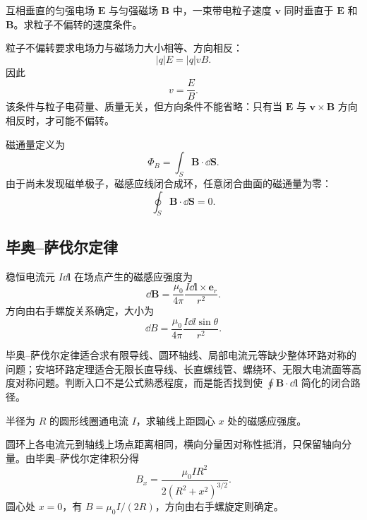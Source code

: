 \begin{example}[title={速度选择器}]\label{eg:velocity-selector}
互相垂直的匀强电场 $\bm E$ 与匀强磁场 $\bm B$ 中，一束带电粒子速度 $\bm v$ 同时垂直于 $\bm E$ 和 $\bm B$。求粒子不偏转的速度条件。
\begin{solution}
粒子不偏转要求电场力与磁场力大小相等、方向相反：
\[
  |q|E=|q|vB.
\]
因此
\[
  v=\frac{E}{B}.
\]
该条件与粒子电荷量、质量无关，但方向条件不能省略：只有当 $\bm E$ 与 $\bm v\times\bm B$ 方向相反时，才可能不偏转。
\end{solution}
\end{example}

\begin{definition}[磁通量与磁场高斯定理]\label{def:magnetic-flux}
磁通量定义为
\[
  \Phi_B=\int_S\bm B\cdot\dd\bm S.
\]
由于尚未发现磁单极子，磁感应线闭合成环，任意闭合曲面的磁通量为零：
\[
  \oint_S\bm B\cdot\dd\bm S=0.
\]
\end{definition}

\subsection{毕奥--萨伐尔定律}

\begin{theorem}[毕奥--萨伐尔定律]\label{thm:biot-savart}
稳恒电流元 $I\dd\bm l$ 在场点产生的磁感应强度为
\[
  \dd\bm B=\frac{\mu_0}{4\pi}\frac{I\dd\bm l\times\bm e_r}{r^2}.
\]
方向由右手螺旋关系确定，大小为
\[
  \dd B=\frac{\mu_0}{4\pi}\frac{I\dd l\sin\theta}{r^2}.
\]
\end{theorem}

\begin{method}[磁场计算定律的选择]
毕奥--萨伐尔定律适合求有限导线、圆环轴线、局部电流元等缺少整体环路对称的问题；安培环路定理适合无限长直导线、长直螺线管、螺绕环、无限大电流面等高度对称问题。判断入口不是公式熟悉程度，而是能否找到使 $\oint\bm B\cdot\dd\bm l$ 简化的闭合路径。
\end{method}

\begin{example}[title={圆电流轴线上的磁场}]\label{eg:loop-B}
半径为 $R$ 的圆形线圈通电流 $I$，求轴线上距圆心 $x$ 处的磁感应强度。
\begin{solution}
圆环上各电流元到轴线上场点距离相同，横向分量因对称性抵消，只保留轴向分量。由毕奥--萨伐尔定律积分得
\[
  B_x=\frac{\mu_0 I R^2}{2(R^2+x^2)^{3/2}}.
\]
圆心处 $x=0$，有 $B=\mu_0 I/(2R)$，方向由右手螺旋定则确定。
\end{solution}
\end{example}

